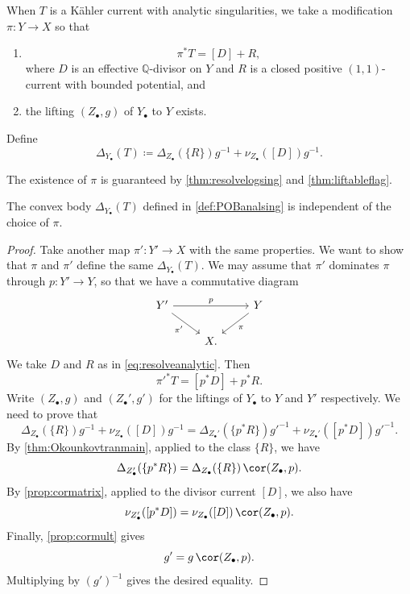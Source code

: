 \begin{definition}\label{def:POBanalsing}
    When $T$ is a Kähler current with analytic singularities, we take a modification $\pi\colon Y\rightarrow X$ so that
    \begin{enumerate}
        \item\label{itm:def:POBanalsing:1}
        \begin{equation}\label{eq:resolveanalytic}
            \pi^*T=[D]+R,
        \end{equation}
        where $D$ is an effective $\mathbb{Q}$-divisor on $Y$ and $R$ is a closed positive $(1,1)$-current with bounded potential, and
        \item\label{itm:def:POBanalsing:2} the lifting $(Z_{\bullet},g)$ of $Y_{\bullet}$ to $Y$ exists.
    \end{enumerate}
Define
\begin{equation}\label{eq:POBanalsing}
\Delta_{Y_{\bullet}}(T)\coloneqq\Delta_{Z_{\bullet}}(\{R\})g^{-1}+\nu_{Z_{\bullet}}([D])g^{-1}.
\end{equation}
\end{definition}
The existence of $\pi$ is guaranteed by \cref{thm:resolvelogsing} and \cref{thm:liftableflag}.

\begin{lemma}\label{lma:Okounkov:L1426}
    The convex body $\Delta_{Y_{\bullet}}(T)$ defined in \cref{def:POBanalsing} is independent of the choice of $\pi$.
\end{lemma}
\begin{proof}
    Take another map $\pi'\colon Y'\rightarrow X$ with the same properties. We want to show that $\pi$ and $\pi'$ define the same $\Delta_{Y_{\bullet}}(T)$. We may assume that $\pi'$ dominates $\pi$ through $p\colon Y'\rightarrow Y$, so that we have a commutative diagram
    \[
    \begin{tikzcd}
Y' \arrow[rr, "p"] \arrow[rd, "\pi'"'] &   & Y \arrow[ld, "\pi"] \\
                                       & X. &
\end{tikzcd}
    \]
    We take $D$ and $R$ as in \eqref{eq:resolveanalytic}. Then
    \[
    \pi'^*T=[p^*D]+p^*R.
    \]
    Write $(Z_{\bullet},g)$ and $(Z_{\bullet}',g')$ for the liftings of $Y_{\bullet}$ to $Y$ and $Y'$ respectively.
    We need to prove that
    \[
    \Delta_{Z_{\bullet}}(\{R\})g^{-1}+\nu_{Z_{\bullet}}([D])g^{-1}=\Delta_{Z_{\bullet}'}(\{p^*R\})g'^{-1}+\nu_{Z_{\bullet}'}([p^*D])g'^{-1}.
    \]
    By \cref{thm:Okounkovtranmain}, applied to the class $\{R\}$, we have
    \[
        \Delta_{Z'_\bullet}(\{p^*R\})=\Delta_{Z_\bullet}(\{R\})\,\cor(Z_\bullet,p).
    \]
    By \cref{prop:cormatrix}, applied to the divisor current $[D]$, we also have
    \[
        \nu_{Z'_\bullet}([p^*D])=\nu_{Z_\bullet}([D])\,\cor(Z_\bullet,p).
    \]
    Finally, \cref{prop:cormult} gives
    \[
        g'=g\,\cor(Z_\bullet,p).
    \]
    Multiplying by $(g')^{-1}$ gives the desired equality.
\end{proof}

